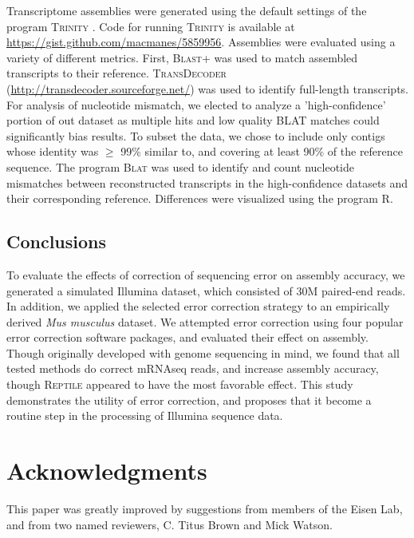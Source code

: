 \documentclass[11pt]{article}
\begin{document}
\noindent
Transcriptome assemblies were generated using the default settings of the program \textsc{Trinity} \citep{Grabherr:2011jb}.  Code for running \textsc{Trinity} is available at \url{https://gist.github.com/macmanes/5859956}. Assemblies were evaluated using a variety of different metrics. First, \textsc{Blast+} \citep{Camacho:2009fc} was used to match assembled transcripts to their reference.  \textsc{TransDecoder} (\url{http://transdecoder.sourceforge.net/}) was used to identify full-length transcripts. For analysis of nucleotide mismatch, we elected to analyze a 'high-confidence' portion of out dataset as multiple hits and low quality BLAT matches could significantly bias results. To subset the data, we chose to include only contigs whose identity was $\geq$ 99\% similar to, and covering at least 90\% of the reference sequence.  The program \textsc{Blat} \citep{Kent:2002jd} was used to identify and count nucleotide mismatches between reconstructed transcripts in the high-confidence datasets and their corresponding reference.  Differences were visualized using the program R. \\

\subsection*{Conclusions}
To evaluate the effects of correction of sequencing error on assembly accuracy, we generated a simulated Illumina dataset, which consisted of 30M paired-end reads.  In addition, we applied the selected error correction strategy to an empirically derived \textit{Mus musculus} dataset. We attempted error correction using four popular error correction software packages, and evaluated their effect on assembly.  Though originally developed with genome sequencing in mind, we found that all tested methods do correct mRNAseq reads, and increase assembly accuracy, though \textsc{Reptile} appeared to have the most favorable effect. This study demonstrates the utility of error correction, and proposes that it become a routine step in the processing of Illumina sequence data. \\



\section*{Acknowledgments}
This paper was greatly improved by suggestions from members of the Eisen Lab, and from two named reviewers, C. Titus Brown and Mick Watson.  

\singlespacing


\end{document}
